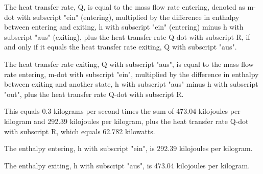 The heat transfer rate, Q, is equal to the mass flow rate entering, denoted as m-dot with subscript "ein" (entering), multiplied by the difference in enthalpy between entering and exiting, h with subscript "ein" (entering) minus h with subscript "aus" (exiting), plus the heat transfer rate Q-dot with subscript R, if and only if it equals the heat transfer rate exiting, Q with subscript "aus".

The heat transfer rate exiting, Q with subscript "aus", is equal to the mass flow rate entering, m-dot with subscript "ein", multiplied by the difference in enthalpy between exiting and another state, h with subscript "aus" minus h with subscript "out", plus the heat transfer rate Q-dot with subscript R.

This equals 0.3 kilograms per second times the sum of 473.04 kilojoules per kilogram and 292.39 kilojoules per kilogram, plus the heat transfer rate Q-dot with subscript R, which equals 62.782 kilowatts.

The enthalpy entering, h with subscript "ein", is 292.39 kilojoules per kilogram.

The enthalpy exiting, h with subscript "aus", is 473.04 kilojoules per kilogram.
